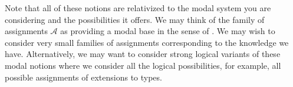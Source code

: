 Note that
all of these notions are relativized to the modal system you are
considering and the possibilities it offers.  We may think of the
family of assignments $\mathcal{A}$ as providing a modal base in the
sense of \cite{Kratzer2012}.
We may wish to consider very small families of
assignments corresponding to the knowledge we have.  Alternatively, we
may want to consider strong logical variants of these modal notions
where we consider all the logical possibilities, for example, all
possible assignments of extensions to types.



